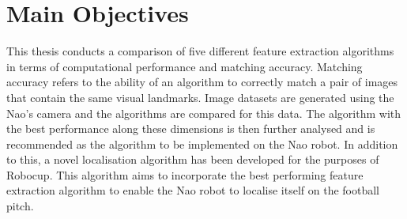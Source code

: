 \section{Main Objectives}
\label{sec:objectives}
This thesis conducts a comparison of five different feature extraction algorithms in terms of computational performance and matching accuracy. Matching accuracy refers to the ability of an algorithm to correctly match a pair of images that contain the same visual landmarks. Image datasets are generated using the Nao's camera and the algorithms are compared for this data. The algorithm with the best performance along these dimensions is then further analysed and is recommended as the algorithm to be implemented on the Nao robot. In addition to this, a novel localisation algorithm has been developed for the purposes of Robocup. This algorithm aims to incorporate the best performing feature extraction algorithm to enable the Nao robot to localise itself on the football pitch.\\


%
%
%
%
%

